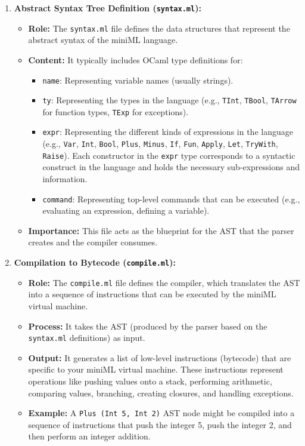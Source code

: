 \documentclass[a4paper,12pt]{article}
\begin{document}
\begin{enumerate}[left=0.5cm]
    \item \textbf{Abstract Syntax Tree Definition (\texttt{syntax.ml}):}
    \begin{itemize}[left=0.5cm]
        \item \textbf{Role:} The \texttt{syntax.ml} file defines the data structures that represent the abstract syntax of the miniML language.
        \item \textbf{Content:} It typically includes OCaml type definitions for:
        \begin{itemize}[left=0.5cm]
            \item \texttt{name}: Representing variable names (usually strings).
            \item \texttt{ty}: Representing the types in the language (e.g., \texttt{TInt}, \texttt{TBool}, \texttt{TArrow} for function types, \texttt{TExp} for exceptions).
            \item \texttt{expr}: Representing the different kinds of expressions in the language (e.g., \texttt{Var}, \texttt{Int}, \texttt{Bool}, \texttt{Plus}, \texttt{Minus}, \texttt{If}, \texttt{Fun}, \texttt{Apply}, \texttt{Let}, \texttt{TryWith}, \texttt{Raise}). Each constructor in the \texttt{expr} type corresponds to a syntactic construct in the language and holds the necessary sub-expressions and information.
            \item \texttt{command}: Representing top-level commands that can be executed (e.g., evaluating an expression, defining a variable).
        \end{itemize}
        \item \textbf{Importance:} This file acts as the blueprint for the AST that the parser creates and the compiler consumes.
    \end{itemize}
    
    \item \textbf{Compilation to Bytecode (\texttt{compile.ml}):}
    \begin{itemize}[left=0.5cm]
        \item \textbf{Role:} The \texttt{compile.ml} file defines the compiler, which translates the AST into a sequence of instructions that can be executed by the miniML virtual machine.
        \item \textbf{Process:} It takes the AST (produced by the parser based on the \texttt{syntax.ml} definitions) as input.
        \item \textbf{Output:} It generates a list of low-level instructions (bytecode) that are specific to your miniML virtual machine. These instructions represent operations like pushing values onto a stack, performing arithmetic, comparing values, branching, creating closures, and handling exceptions.
        \item \textbf{Example:} A \texttt{Plus (Int 5, Int 2)} AST node might be compiled into a sequence of instructions that push the integer 5, push the integer 2, and then perform an integer addition.
    \end{itemize}
\end{enumerate}
\end{document}
